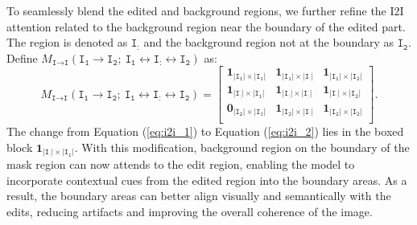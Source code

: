 \documentclass{article}
\begin{document}
To seamlessly blend the edited and background regions, we further refine the I2I attention related to the background region near the boundary of the edited part. The region is denoted as $\texttt{I}_\texttt{:}$ and the background region not at the boundary as $\texttt{I}_\texttt{2}$. Define $M_{\texttt{I}\to\texttt{I}}(\texttt{I}_\texttt{1}\to\texttt{I}_\texttt{2};\  \texttt{I}_\texttt{1}\leftrightarrow\texttt{I}_\texttt{:}\!\leftrightarrow \texttt{I}_\texttt{2})$ as:
\begin{equation}
M_{\texttt{I}\to\texttt{I}}(\texttt{I}_\texttt{1}\to\texttt{I}_\texttt{2};\  \texttt{I}_\texttt{1}\leftrightarrow\texttt{I}_\texttt{:}\!\leftrightarrow \texttt{I}_\texttt{2}) =   \begin{bmatrix}
        \mathbf{1}_{|\texttt{I}_\texttt{1}|\times|\texttt{I}_\texttt{1}|} &  \mathbf{1}_{|\texttt{I}_\texttt{1}|\times|\texttt{I}_\texttt{:}|}&\mathbf{1}_{|\texttt{I}_\texttt{1}|\times|\texttt{I}_\texttt{2}|}\\

\boxed{\mathbf{1}_{|\texttt{I}_\texttt{:}|\times|\texttt{I}_\texttt{1}|}} &  \mathbf{1}_{|\texttt{I}_\texttt{:}|\times|\texttt{I}_\texttt{:}|}&\mathbf{1}_{|\texttt{I}_\texttt{:}|\times|\texttt{I}_\texttt{2}|}\\
\mathbf{0}_{|\texttt{I}_\texttt{2}|\times|\texttt{I}_\texttt{1}|} &  \mathbf{1}_{|\texttt{I}_\texttt{2}|\times|\texttt{I}_\texttt{:}|}&\mathbf{1}_{|\texttt{I}_\texttt{2}|\times|\texttt{I}_\texttt{2}|}\\
    \end{bmatrix}.
\label{eq:i2i_2}
\end{equation}
The change from Equation (\ref{eq:i2i_1}) to Equation (\ref{eq:i2i_2}) lies in the boxed block $\mathbf{1}_{|\texttt{I}_\texttt{:}|\times|\texttt{I}_\texttt{1}|}$.
With this modification, background region on the boundary of the mask region can now attends to the edit region,  enabling the model to  incorporate contextual cues from the edited region into the boundary areas. As a result, the boundary areas can better align visually and semantically with the edits, reducing artifacts and improving the overall coherence of the image.
\end{document}
